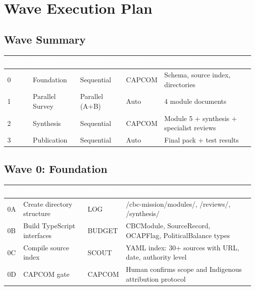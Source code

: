 \documentclass[11pt,letterpaper]{article}
\newcommand{\tableheader}[1]{\textbf{\sffamily\textcolor{white}{#1}}}
\begin{document}
\section{Wave Execution Plan}

\subsection{Wave Summary}

\begin{center}
\begin{tabularx}{\textwidth}{C{1cm}L{3cm}C{2cm}C{2cm}X}
\toprule
{}
\tableheader{Wave} & \tableheader{Name} & \tableheader{Mode} & \tableheader{Gate} & \tableheader{Output} \\
 & Foundation & Sequential & CAPCOM & Schema, source index, directories \\
1 & Parallel Survey & Parallel (A+B) & Auto & 4 module documents \\
2 & Synthesis & Sequential & CAPCOM & Module 5 + synthesis + specialist reviews \\
3 & Publication & Sequential & Auto & Final pack + test results \\
\bottomrule
\end{tabularx}
\end{center}

\subsection{Wave 0: Foundation}

\begin{center}
\begin{tabularx}{\textwidth}{C{0.7cm}L{3.5cm}C{1.5cm}X}
\toprule
{}
\tableheader{ID} & \tableheader{Task} & \tableheader{Agent} & \tableheader{Output} \\
\midrule
0A & Create directory structure & LOG & /cbc-mission/modules/, /reviews/, /synthesis/ \\
0B & Build TypeScript interfaces & BUDGET & CBCModule, SourceRecord, OCAPFlag, PoliticalBalance types \\
0C & Compile source index & SCOUT & YAML index: 30+ sources with URL, date, authority level \\
0D & CAPCOM gate & CAPCOM & Human confirms scope and Indigenous attribution protocol \\
\bottomrule
\end{tabularx}
\end{center}
\end{document}
